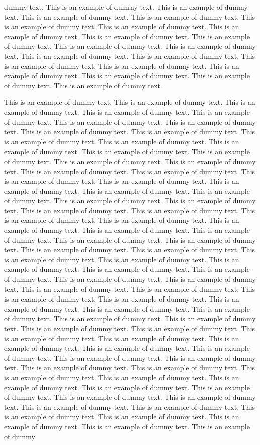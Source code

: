 \documentclass[lineno]{jfm}
\begin{document}
dummy text. This is an example of dummy text. This is an example of dummy text. This is an example of dummy text. This is an example of dummy text. This is an example of dummy text. This is an example of dummy text. This is an example of dummy text. This is an example of dummy text. This is an example of dummy text. This is an example of dummy text. This is an example of dummy text. This is an example of dummy text. This is an example of dummy text. This is an example of dummy text. This is an example of dummy text. This is an example of dummy text. This is an example of dummy text. This is an example of dummy text. This is an example of dummy text. 

This is an example of dummy text. This is an example of dummy text. This is an example of dummy text. This is an example of dummy text. This is an example of dummy text. This is an example of dummy text. This is an example of dummy text. This is an example of dummy text. This is an example of dummy text. This is an example of dummy text. This is an example of dummy text. This is an example of dummy text. This is an example of dummy text. This is an example of dummy text. This is an example of dummy text. This is an example of dummy text. This is an example of dummy text. This is an example of dummy text. This is an example of dummy text. This is an example of dummy text. This is an example of dummy text. This is an example of dummy text. This is an example of dummy text. This is an example of dummy text. This is an example of dummy text. This is an example of dummy text. This is an example of dummy text. This is an example of dummy text. This is an example of dummy text. This is an example of dummy text. This is an example of dummy text. This is an example of dummy text. This is an example of dummy text. This is an example of dummy text. This is an example of dummy text. This is an example of dummy text. This is an example of dummy text. This is an example of dummy text. This is an example of dummy text. This is an example of dummy text. This is an example of dummy text. This is an example of dummy text. This is an example of dummy text. This is an example of dummy text. This is an example of dummy text. This is an example of dummy text. This is an example of dummy text. This is an example of dummy text. This is an example of dummy text. This is an example of dummy text. This is an example of dummy text. This is an example of dummy text. This is an example of dummy text. This is an example of dummy text. This is an example of dummy text. This is an example of dummy text. This is an example of dummy text. This is an example of dummy text. This is an example of dummy text. This is an example of dummy text. This is an example of dummy text. This is an example of dummy text. This is an example of dummy text. This is an example of dummy text. This is an example of dummy text. This is an example of dummy text. This is an example of dummy text. This is an example of dummy text. This is an example of dummy text. This is an example of dummy text. This is an example of dummy text. This is an example of dummy text. This is an example of dummy text. This is an example of dummy text. This is an example of dummy text. This is an example of dummy text. This is an example of dummy 
\end{document}
